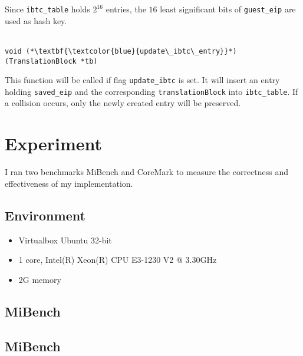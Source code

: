 \documentclass[12pt]{article}
\begin{document}
        Since \verb|ibtc_table| holds $2^{16}$ entries, the $16$ least significant bits of \verb|guest_eip| are used as hash key.
        \\\\
        \begin{lstlisting}[style=Function]
            void (*\textbf{\textcolor{blue}{update\_ibtc\_entry}}*)(TranslationBlock *tb)
        \end{lstlisting}
        This function will be called if flag \verb|update_ibtc| is set. 
        It will insert an entry holding \verb|saved_eip| and the corresponding \verb|translationBlock| into \verb|ibtc_table|. 
        If a collision occurs, only the newly created entry will be preserved.


\section{Experiment}
    I ran two benchmarks MiBench and CoreMark to measure the correctness and effectiveness of my implementation.
    \subsection{Environment}
        \begin{itemize}
            \item Virtualbox Ubuntu 32-bit
            \item 1 core, Intel(R) Xeon(R) CPU E3-1230 V2 @ 3.30GHz
            \item 2G memory
        \end{itemize}

    \subsection{MiBench}

    \subsection{MiBench}
    

 
\end{document}
